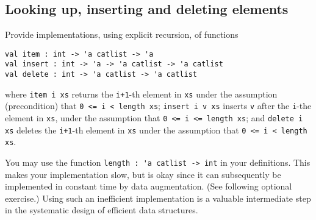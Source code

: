 \subsection*{Looking up, inserting and deleting elements}

Provide implementations, using explicit recursion, of functions
\begin{verbatim}
val item : int -> 'a catlist -> 'a
val insert : int -> 'a -> 'a catlist -> 'a catlist
val delete : int -> 'a catlist -> 'a catlist
\end{verbatim}
where \verb|item i xs| returns the \verb|i+1|-th element in \verb|xs| under the assumption (precondition) that \verb|0 <= i < length xs|;
\verb|insert i v xs| inserts \verb|v| after the \verb|i|-the element in \verb|xs|, under the assumption that \verb|0 <= i <= length xs|;
and \verb|delete i xs| deletes the \verb|i+1|-th element in \verb|xs| under the assumption that \verb|0 <= i < length xs|.

You may use the function \verb|length : 'a catlist -> int| in your definitions. This makes your implementation slow, but is okay since it can subsequently be implemented in constant time by data augmentation. (See following optional exercise.)  Using such an inefficient implementation is a valuable intermediate step in the systematic design of efficient data structures.
